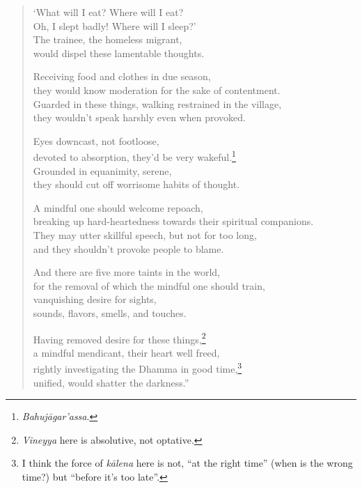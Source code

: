 \documentclass[12pt,openany]{book}%
\let\oldcontentsline\contentsline
\newcommand{\nopagecontentsline}[3]{\oldcontentsline{#1}{#2}{}}
\begin{document}
\begin{verse}
‘What will I eat? Where will I eat? \\
Oh, I slept badly! Where will I sleep?’ \\
The trainee, the homeless migrant, \\
would dispel these lamentable thoughts. 

Receiving food and clothes in due season, \\
they would know moderation for the sake of contentment. \\
Guarded in these things, walking restrained in the village, \\
they wouldn’t speak harshly even when provoked. 

Eyes downcast, not footloose, \\
devoted to absorption, they’d be very wakeful.\footnote{\textit{\textsanskrit{Bahujāgar}’assa}. } \\
Grounded in equanimity, serene, \\
they should cut off worrisome habits of thought. 

A mindful one should welcome repoach, \\
breaking up hard-heartedness towards their spiritual companions. \\
They may utter skillful speech, but not for too long, \\
and they shouldn’t provoke people to blame. 

And there are five more taints in the world, \\
for the removal of which the mindful one should train, \\
vanquishing desire for sights, \\
sounds, flavors, smells, and touches. 

Having removed desire for these things,\footnote{\textit{Vineyya} here is absolutive, not optative. } \\
a mindful mendicant, their heart well freed, \\
rightly investigating the Dhamma in good time,\footnote{I think the force of \textit{\textsanskrit{kālena}} here is not, “at the right time” (when is the wrong time?) but “before it’s too late”. } \\
unified, would shatter the darkness.” 

%
\end{verse}

%
\end{document}
